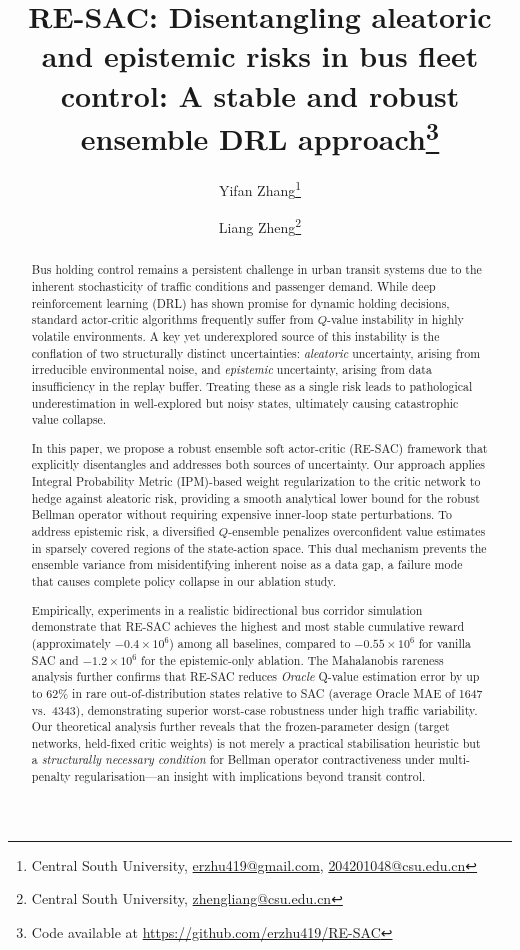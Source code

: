 \documentclass[10pt]{article}
\title{RE-SAC: Disentangling aleatoric and epistemic risks in bus fleet control: A stable and robust ensemble DRL approach\footnote{Code available at \url{https://github.com/erzhu419/RE-SAC}}}
\author{
  Yifan Zhang\thanks{Central South University, \href{mailto:erzhu419@gmail.com}{erzhu419@gmail.com}, \href{mailto:204201048@csu.edu.cn}{204201048@csu.edu.cn}} \and
  Liang Zheng\thanks{Central South University, \href{mailto:zhengliang@csu.edu.cn}{zhengliang@csu.edu.cn}}
}
\date{}
\begin{document}
\maketitle


\begin{abstract}
Bus holding control remains a persistent challenge in urban transit systems due to the inherent stochasticity of traffic conditions and passenger demand. While deep reinforcement learning (DRL) has shown promise for dynamic holding decisions, standard actor-critic algorithms frequently suffer from $Q$-value instability in highly volatile environments. A key yet underexplored source of this instability is the conflation of two structurally distinct uncertainties: \textit{aleatoric} uncertainty, arising from irreducible environmental noise, and \textit{epistemic} uncertainty, arising from data insufficiency in the replay buffer. Treating these as a single risk leads to pathological underestimation in well-explored but noisy states, ultimately causing catastrophic value collapse.

In this paper, we propose a robust ensemble soft actor-critic (RE-SAC) framework that explicitly disentangles and addresses both sources of uncertainty. Our approach applies Integral Probability Metric (IPM)-based weight regularization to the critic network to hedge against aleatoric risk, providing a smooth analytical lower bound for the robust Bellman operator without requiring expensive inner-loop state perturbations. To address epistemic risk, a diversified $Q$-ensemble penalizes overconfident value estimates in sparsely covered regions of the state-action space. This dual mechanism prevents the ensemble variance from misidentifying inherent noise as a data gap, a failure mode that causes complete policy collapse in our ablation study.

Empirically, experiments in a realistic bidirectional bus corridor simulation demonstrate that RE-SAC achieves the highest and most stable cumulative reward (approximately $-0.4 \times 10^6$) among all baselines, compared to $-0.55 \times 10^6$ for vanilla SAC and $-1.2 \times 10^6$ for the epistemic-only ablation. The Mahalanobis rareness analysis further confirms that RE-SAC reduces \emph{Oracle} Q-value estimation error by up to $62\%$ in rare out-of-distribution states relative to SAC (average Oracle MAE of 1647 vs.\ 4343), demonstrating superior worst-case robustness under high traffic variability.
Our theoretical analysis further reveals that the frozen-parameter design (target networks, held-fixed critic weights) is not merely a practical stabilisation heuristic but a \emph{structurally necessary condition} for Bellman operator contractiveness under multi-penalty regularisation---an insight with implications beyond transit control.
\end{abstract}
\end{document}

